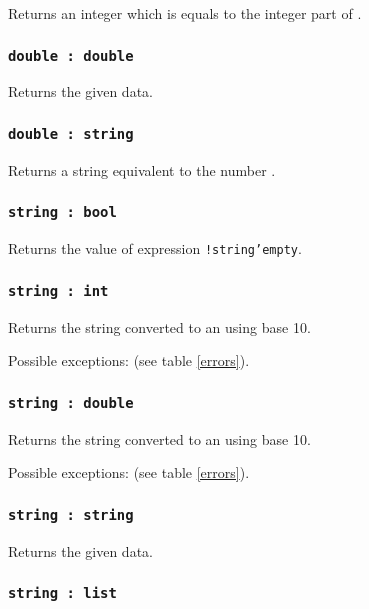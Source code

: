 Returns an integer which is equals to the integer part of \double.

\subsubsection{\texttt{double : double}}

Returns the given data.

\subsubsection{\texttt{double : string}}

Returns a string equivalent to the number \double.

\subsubsection{\texttt{string : bool}}

Returns the value of expression \texttt{!string'empty}.

\subsubsection{\texttt{string : int}}

Returns the string converted to an \integer{} using base 10.

Possible exceptions:  (see table \ref{errors}).

\subsubsection{\texttt{string : double}}

Returns the string converted to an \double{} using base 10.

Possible exceptions:  (see table \ref{errors}).

\subsubsection{\texttt{string : string}}

Returns the given data.

\subsubsection{\texttt{string : list}}

